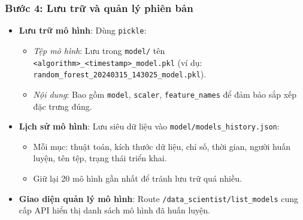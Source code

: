 ﻿\documentclass{article}
\begin{document}
\subsubsection{Bước 4: Lưu trữ và quản lý phiên bản}
\begin{itemize}
    \item \textbf{Lưu trữ mô hình}: Dùng \texttt{pickle}:
    \begin{itemize}
        \item \textit{Tệp mô hình}: Lưu trong \texttt{model/} tên \texttt{<algorithm>\_<timestamp>\_model.pkl} (ví dụ: \texttt{random\_forest\_20240315\_143025\_model.pkl}).
        \item \textit{Nội dung}: Bao gồm \texttt{model}, \texttt{scaler}, \texttt{feature\_names} để đảm bảo sắp xếp đặc trưng đúng.
    \end{itemize}
    
    \item \textbf{Lịch sử mô hình}: Lưu siêu dữ liệu vào \texttt{model/models\_history.json}:
    \begin{itemize}
        \item Mỗi mục: thuật toán, kích thước dữ liệu, chỉ số, thời gian, người huấn luyện, tên tệp, trạng thái triển khai.
        \item Giữ lại 20 mô hình gần nhất để tránh lưu trữ quá nhiều.
    \end{itemize}
    
    \item \textbf{Giao diện quản lý mô hình}: Route \texttt{/data\_scientist/list\_models} cung cấp API hiển thị danh sách mô hình đã huấn luyện.
\end{itemize}
\end{document}
